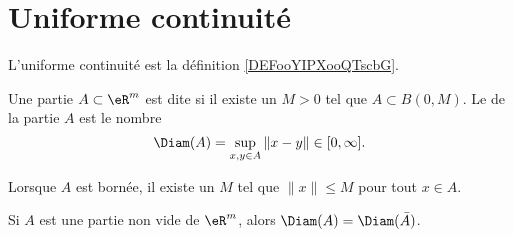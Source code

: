 
\section{Uniforme continuité}		
\label{SECooZSZMooBYSDFO}
\label{SecUnifContinue}

L'uniforme continuité est la définition \ref{DEFooYIPXooQTscbG}.

\begin{definition}
	Une partie \( A\subset\eR^m\) est dite  si il existe un \( M>0\) tel que \( A\subset B(0,M)\). Le  de la partie \( A\) est le nombre
	\begin{equation}
		\Diam(A)=\sup_{x,y\in A}\| x-y \|\in\mathopen[ 0 , \infty \mathclose].
	\end{equation}
\end{definition}
Lorsque \( A\) est bornée, il existe un \( M\) tel que \( \| x \|\leq M\) pour tout \( x\in A\).

\begin{lemma}       \label{LEMooFABOooZYFjhv}
	Si \( A\) est une partie non vide de \( \eR^m\), alors \( \Diam(A)=\Diam(\bar A)\).
\end{lemma}

